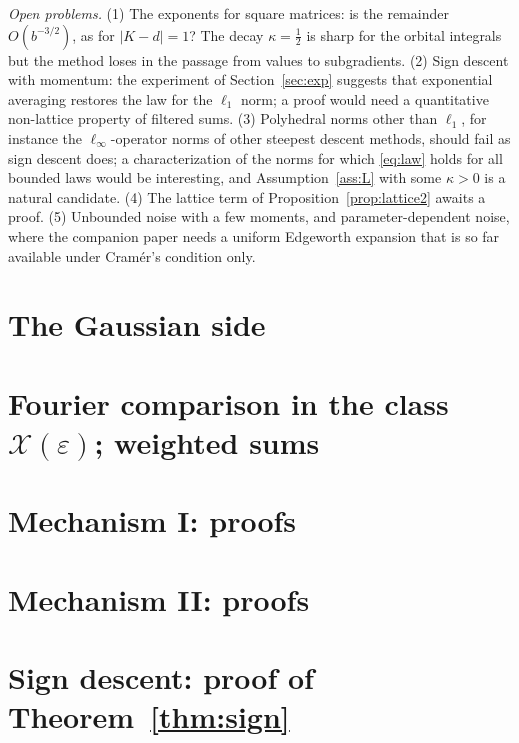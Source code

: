 \documentclass[anon,12pt]{colt2026}
\begin{document}
\emph{Open problems.} (1) The exponents for square matrices: is the remainder $O(b^{-3/2})$, as for $|K-d|=1$? The
decay $\kappa=\frac12$ is sharp for the orbital integrals but the method loses in the passage from values to
subgradients. (2) Sign descent with momentum: the experiment of
Section~\ref{sec:exp} suggests that exponential averaging restores the law for the $\ell_1$ norm; a proof would need a
quantitative non-lattice property of filtered sums. (3) Polyhedral norms other than $\ell_1$, for instance the $\ell_\infty$-operator norms of other steepest
descent methods, should fail as sign descent does; a characterization of the norms for which \eqref{eq:law} holds for
all bounded laws would be interesting, and Assumption~\ref{ass:L} with some $\kappa>0$ is a natural candidate. (4) The
lattice term of Proposition~\ref{prop:lattice2} awaits a proof. (5) Unbounded noise with a few moments, and
parameter-dependent noise, where the companion paper needs a uniform Edgeworth expansion that is so far available
under Cram\'er's condition only.



\appendix
\section{The Gaussian side}\label{app:gauss}


\section{Fourier comparison in the class $\mathcal X(\varepsilon)$; weighted sums}\label{app:fourier}


\section{Mechanism I: proofs}\label{app:codim}


\section{Mechanism II: proofs}\label{app:laplace}



\section{Sign descent: proof of Theorem~\ref{thm:sign}}\label{app:sign}

\end{document}
